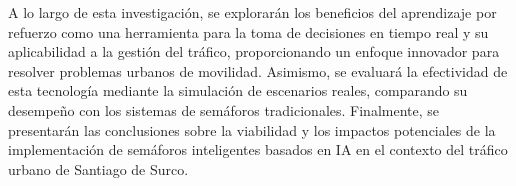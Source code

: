 A lo largo de esta investigación, se explorarán los beneficios del aprendizaje por refuerzo como una herramienta para la toma de decisiones en tiempo real y su aplicabilidad a la gestión del tráfico, proporcionando un enfoque innovador para resolver problemas urbanos de movilidad. Asimismo, se evaluará la efectividad de esta tecnología mediante la simulación de escenarios reales, comparando su desempeño con los sistemas de semáforos tradicionales. Finalmente, se presentarán las conclusiones sobre la viabilidad y los impactos potenciales de la implementación de semáforos inteligentes basados en IA en el contexto del tráfico urbano de Santiago de Surco.
